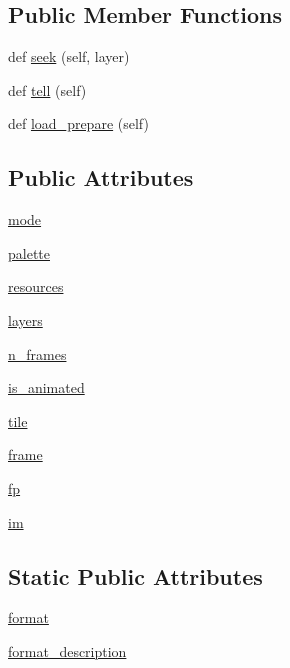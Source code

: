 \subsection*{Public Member Functions}
\begin{DoxyCompactItemize}
\item 
def \hyperlink{classPIL_1_1PsdImagePlugin_1_1PsdImageFile_a1cd54ce780962c9d28ec404b71d00a2b}{seek} (self, layer)
\item 
def \hyperlink{classPIL_1_1PsdImagePlugin_1_1PsdImageFile_a8a3cc1cd43684dce0ee73ce3fe277e43}{tell} (self)
\item 
def \hyperlink{classPIL_1_1PsdImagePlugin_1_1PsdImageFile_a1cc70f4a53f4ec242d523579501d3a33}{load\+\_\+prepare} (self)
\end{DoxyCompactItemize}
\subsection*{Public Attributes}
\begin{DoxyCompactItemize}
\item 
\hyperlink{classPIL_1_1PsdImagePlugin_1_1PsdImageFile_a15dd210fe6eb7a939add4695a124d86a}{mode}
\item 
\hyperlink{classPIL_1_1PsdImagePlugin_1_1PsdImageFile_a8868a15fd1880ee374167c3d204dafea}{palette}
\item 
\hyperlink{classPIL_1_1PsdImagePlugin_1_1PsdImageFile_a1a65a241ac2fd5c40c52559f8734a491}{resources}
\item 
\hyperlink{classPIL_1_1PsdImagePlugin_1_1PsdImageFile_aa0f7727fc756b6311703ecaa280dc4b7}{layers}
\item 
\hyperlink{classPIL_1_1PsdImagePlugin_1_1PsdImageFile_af422edc439c482bda0a259151a73ec58}{n\+\_\+frames}
\item 
\hyperlink{classPIL_1_1PsdImagePlugin_1_1PsdImageFile_a9aebf95363afd9b8d86d0d06f1a95756}{is\+\_\+animated}
\item 
\hyperlink{classPIL_1_1PsdImagePlugin_1_1PsdImageFile_a1cb3469c1c0140756fc261ac65b3c77b}{tile}
\item 
\hyperlink{classPIL_1_1PsdImagePlugin_1_1PsdImageFile_a103ce5e039cfab146f10d285443e7abb}{frame}
\item 
\hyperlink{classPIL_1_1PsdImagePlugin_1_1PsdImageFile_ae5108af59e0ae10230a1b1de2923b758}{fp}
\item 
\hyperlink{classPIL_1_1PsdImagePlugin_1_1PsdImageFile_a8d4e97ee29e708680c1dbce524ede40d}{im}
\end{DoxyCompactItemize}
\subsection*{Static Public Attributes}
\begin{DoxyCompactItemize}
\item 
\hyperlink{classPIL_1_1PsdImagePlugin_1_1PsdImageFile_ab0b94449effb31aac7b7bef7b0c2edb0}{format}
\item 
\hyperlink{classPIL_1_1PsdImagePlugin_1_1PsdImageFile_a4921d788f376ddd82d9ab6a33afed116}{format\+\_\+description}
\end{DoxyCompactItemize}



